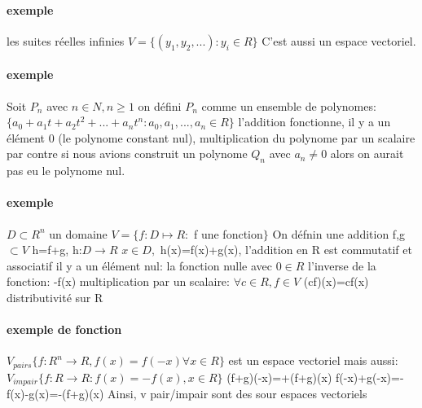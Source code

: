 \documentclass[a4paper,10pt]{article}
\begin{document}
\paragraph{exemple}
les suites réelles infinies
\newline
$V=\{(y_1,y_2,...):y_i\in R\}$
\newline
C'est aussi un espace vectoriel.
\paragraph{exemple}
Soit $P_n$ avec $n\in N, n\geq 1$
\newline
on défini $P_n$ comme un ensemble de polynomes:$\{a_0+a_1t+a_2t^2+...+a_nt^n:a_0,a_1,...,a_n\in R\}$
\newline
l'addition fonctionne, il y a un élément 0 (le polynome constant nul), multiplication du polynome par un scalaire
\newline
par contre si nous avions construit un polynome $Q_n$ avec $a_n\neq 0$ alors on aurait pas eu le polynome nul.
\paragraph{exemple}
$D\subset R^n$ un domaine
\newline
$V=\{f:D\mapsto R:$ f une fonction$\}$
\newline
On défnin une addition f,g$\subset V$ h=f+g, h:$D\rightarrow R$
\newline
$x\in D,$ h(x)=f(x)+g(x), l'addition en R est commutatif et associatif
\newline
il y a un élément nul: la fonction nulle avec $0\in R$
\newline
l'inverse de la fonction: -f(x)
\newline
multiplication par un scalaire: $\forall c\in R, f\in V$ (cf)(x)=cf(x)
\newline
distributivité sur R 
\paragraph{exemple de fonction}
$V_{pairs}\{f: R^n\rightarrow R, f(x)=f(-x)\forall x \in R\}$ est un espace vectoriel 
\newline
mais aussi: $V_{impair}\{f: R\rightarrow R: f(x)=-f(x),x  \in R\}$
\newline
(f+g)(-x)=+(f+g)(x)
\newline
f(-x)+g(-x)=-f(x)-g(x)=-(f+g)(x)
\newline
Ainsi, v pair/impair sont des sour espaces vectoriels
\end{document}
